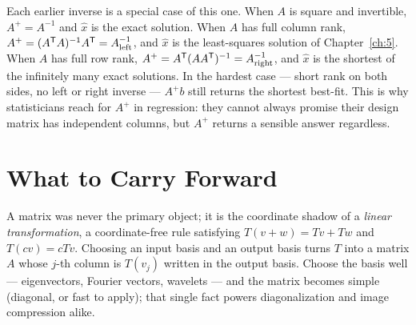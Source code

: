 
Each earlier inverse is a special case of this one. When $A$ is square and invertible, $A^{+}=A^{-1}$ and $\hat x$ is the exact solution. When $A$ has full column rank, $A^{+}=(A^{\mathsf T} A)^{-1}A^{\mathsf T}=A^{-1}_{\text{left}}$, and $\hat x$ is the least-squares solution of Chapter~\ref{ch:5}. When $A$ has full row rank, $A^{+}=A^{\mathsf T}(AA^{\mathsf T})^{-1}=A^{-1}_{\text{right}}$, and $\hat x$ is the shortest of the infinitely many exact solutions. In the hardest case --- short rank on both sides, no left or right inverse --- $A^{+}b$ still returns the shortest best-fit. This is why statisticians reach for $A^{+}$ in regression: they cannot always promise their design matrix has independent columns, but $A^{+}$ returns a sensible answer regardless.


\section{What to Carry Forward}

A matrix was never the primary object; it is the coordinate shadow of a \emph{linear transformation}, a coordinate-free rule satisfying $T(v+w)=Tv+Tw$ and $T(cv)=cTv$. Choosing an input basis and an output basis turns $T$ into a matrix $A$ whose $j$-th column is $T(v_j)$ written in the output basis. Choose the basis well --- eigenvectors, Fourier vectors, wavelets --- and the matrix becomes simple (diagonal, or fast to apply); that single fact powers diagonalization and image compression alike.

